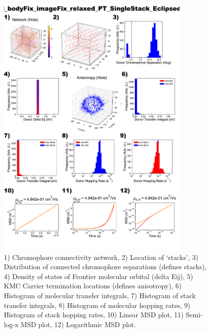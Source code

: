 \documentclass[12pt]{article}
\begin{document}
\begin{figure}[h]\centering
	\includegraphics[width=0.85\textwidth]{Figures/VRH_bodyFix_imageFix_relaxed_PT_SingleStack_Eclipsed_AA.png}
    \caption{   1) Chromophore connectivity network, 
                2) Location of `stacks', 
                3) Distribution of connected chromophore separations (defines stacks),
                4) Density of states of Frontier molecular orbital (delta Eij),
                5) KMC Carrier termination locations (defines anisotropy),
                6) Histogram of molecular transfer integrals,
                7) Histogram of stack transfer integrals,
                8) Histogram of molecular hopping rates,
                9) Histogram of stack hopping rates,
                10) Linear MSD plot,
                11) Semi-log-x MSD plot,
                12) Logarithmic MSD plot.}
	\label{fig:VRHPTSingEcl}
\end{figure}
\end{document}
